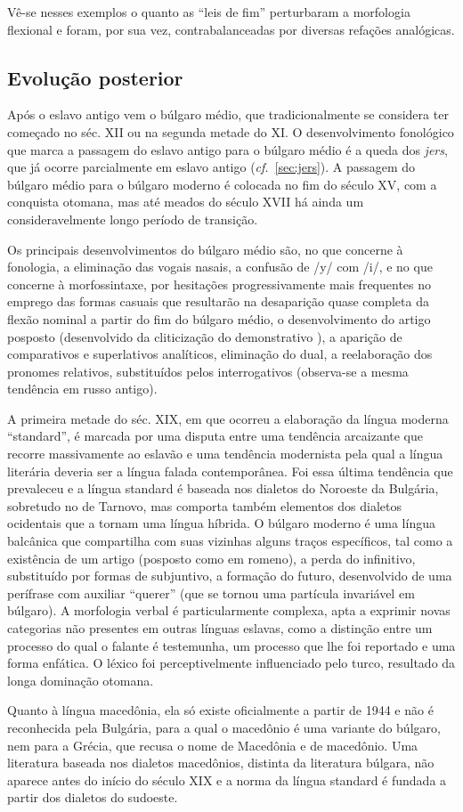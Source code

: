 Vê-se nesses exemplos o quanto as ``leis de fim'' perturbaram a
morfologia flexional e foram, por sua vez, contrabalanceadas por
diversas refações analógicas.

\subsection{Evolução posterior}

Após o eslavo antigo vem o búlgaro médio, que tradicionalmente se considera
ter começado no séc. XII ou na segunda metade do XI\@. O
desenvolvimento fonológico que marca a passagem do eslavo antigo para o búlgaro
médio é a queda dos \emph{jers}, que já ocorre parcialmente em eslavo antigo
(\emph{cf.}~\ref{sec:jers}). A passagem do búlgaro médio para o búlgaro moderno é
colocada no fim do século XV, com a conquista otomana, mas até meados do
século XVII há ainda um consideravelmente longo período de transição.

Os principais desenvolvimentos do búlgaro médio são, no que concerne à
fonologia, a eliminação das vogais nasais, a confusão de /y/ com
/i/, e no que concerne à morfossintaxe, por hesitações progressivamente
mais frequentes no emprego das formas casuais que resultarão na
desaparição quase completa da flexão nominal a partir do fim do
búlgaro médio, o desenvolvimento do artigo posposto (desenvolvido
da cliticização do demonstrativo ), a aparição de comparativos
e superlativos analíticos, eliminação do dual, a reelaboração dos
pronomes relativos, substituídos pelos interrogativos (observa-se a
mesma tendência em russo antigo).

A primeira metade do séc. XIX, em que ocorreu a elaboração da língua
moderna ``standard'', é marcada por uma disputa entre uma tendência
arcaizante que recorre massivamente ao eslavão e uma tendência
modernista pela qual a língua literária deveria ser a língua falada
contemporânea. Foi essa última tendência que prevaleceu e a língua
standard é baseada nos dialetos do Noroeste da Bulgária, sobretudo no de
Tarnovo, mas comporta também elementos dos dialetos ocidentais que a
tornam uma língua híbrida. O búlgaro moderno é uma língua balcânica que
compartilha com suas vizinhas alguns traços específicos, tal como a
existência de um artigo (posposto como em romeno), a perda do
infinitivo, substituído por formas de subjuntivo, a formação do
futuro, desenvolvido de uma perífrase com auxiliar ``querer'' (que se
tornou uma partícula invariável em búlgaro). A morfologia verbal é
particularmente complexa, apta a exprimir novas categorias não presentes
em outras línguas eslavas, como a distinção entre um processo do qual o
falante é testemunha, um processo que lhe foi reportado e uma forma
enfática. O léxico foi perceptivelmente influenciado pelo turco,
resultado da longa dominação otomana.

Quanto à língua macedônia, ela só existe oficialmente a partir de
1944 e não é reconhecida pela Bulgária, para a qual o macedônio é uma
variante do búlgaro, nem para a Grécia, que recusa o nome de Macedônia e
de macedônio. Uma literatura baseada nos dialetos macedônios, distinta
da literatura búlgara, não aparece antes do início do século XIX e a
norma da língua standard é fundada a partir dos dialetos do sudoeste.
